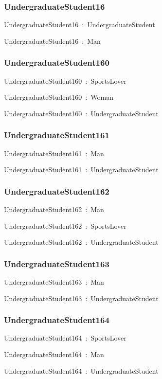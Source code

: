 \documentclass{article}
\begin{document}
\subsubsection*{UndergraduateStudent16}

UndergraduateStudent16~:~UndergraduateStudent

UndergraduateStudent16~:~Man

\subsubsection*{UndergraduateStudent160}

UndergraduateStudent160~:~SportsLover

UndergraduateStudent160~:~Woman

UndergraduateStudent160~:~UndergraduateStudent

\subsubsection*{UndergraduateStudent161}

UndergraduateStudent161~:~Man

UndergraduateStudent161~:~UndergraduateStudent

\subsubsection*{UndergraduateStudent162}

UndergraduateStudent162~:~Man

UndergraduateStudent162~:~SportsLover

UndergraduateStudent162~:~UndergraduateStudent

\subsubsection*{UndergraduateStudent163}

UndergraduateStudent163~:~Man

UndergraduateStudent163~:~UndergraduateStudent

\subsubsection*{UndergraduateStudent164}

UndergraduateStudent164~:~SportsLover

UndergraduateStudent164~:~Man

UndergraduateStudent164~:~UndergraduateStudent
\end{document}
